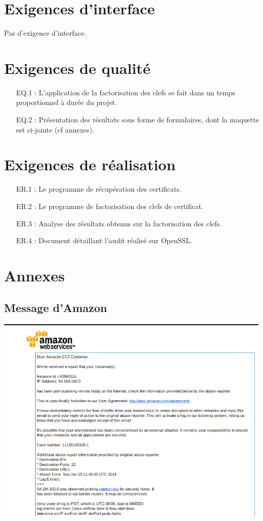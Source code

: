 \documentclass[a4paper,11pt,french]{article}
\begin{document}
\section{Exigences d'interface}
Pas d'exigence d'interface.

\section{Exigences de qualité}
\begin{enumerate}
	\item [EQ.1] : L'application de la factorisation des clefs se fait dans un temps proportionnel à durée du projet.
	\item [EQ.2] : Présentation des résultats sous forme de formulaires, dont la maquette est ci-jointe (cf annexes).
\end{enumerate}

\section{Exigences de réalisation}
\begin{enumerate}
	\item [ER.1] : Le programme de récupération des certificats.
	\item [ER.2] : Le programme de factorisation des clefs de certificat.
	\item [ER.3] : Analyse des résultats obtenus sur la factorisation des clefs.
	\item [ER.4] : Document détaillant l'audit réalisé sur OpenSSL.
\end{enumerate}

\section{Annexes}
\subsection{Message d'Amazon}
\begin{center}
\includegraphics[width=500px]{amazon_.png}
\end{center}
\end{document}

